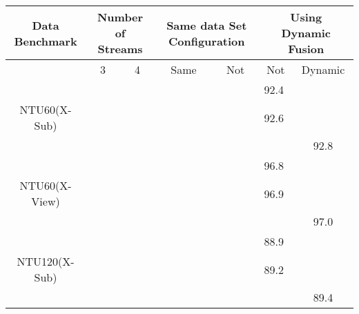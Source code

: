 \documentclass[letterpaper]{article} \usepackage[submission]{aaai23}  \usepackage{times}  \usepackage{helvet}  \usepackage{courier}  \usepackage[hyphens]{url}  \usepackage{graphicx} \urlstyle{rm} \def\UrlFont{\rm}  \usepackage{natbib}  \usepackage{caption} \frenchspacing  \setlength{\pdfpagewidth}{8.5in} \setlength{\pdfpageheight}{11in} \usepackage{algorithm}
\begin{document}
\begin{table*}[ht]
 \centering
\begin{tabular}{cccclll}
\hline\noalign{\smallskip}
Data Benchmark                                     & \multicolumn{2}{c}{Number of Streams}             &\multicolumn{2}{c}{Same data Set Configuration}  & \multicolumn{2}{c}{Using Dynamic Fusion}                \\ \hline
                                                   & 3                      & 4                      & Same                   & \multicolumn{1}{c}{Not} & \multicolumn{1}{c}{Not}   & \multicolumn{1}{c}{Dynamic} \\ \hline
\multicolumn{1}{c}{} & \multicolumn{1}{c}{} & \multicolumn{1}{c}{}  & \multicolumn{1}{c}{} & \multicolumn{1}{l}{}   & \multicolumn{1}{l}{92.4} & \multicolumn{1}{l}{}       \\ 
\multicolumn{1}{c}{{NTU60(X-Sub)}}                              & \multicolumn{1}{c}{} & \multicolumn{1}{c}{}  & \multicolumn{1}{c}{} & \multicolumn{1}{l}{}   & \multicolumn{1}{l}{92.6} & \multicolumn{1}{l}{}       \\ 
\multicolumn{1}{c}{}                              & \multicolumn{1}{l}{}  & \multicolumn{1}{c}{} & \multicolumn{1}{c}{}  & \multicolumn{1}{c}{}  & \multicolumn{1}{l}{}     & \multicolumn{1}{c}{92.8}   \\ \hline

\multicolumn{1}{c}{} & \multicolumn{1}{c}{} & \multicolumn{1}{c}{}  & \multicolumn{1}{c}{} & \multicolumn{1}{l}{}   & \multicolumn{1}{l}{96.8} & \multicolumn{1}{l}{}       \\ 
\multicolumn{1}{c}{{NTU60(X-View)}}                              & \multicolumn{1}{c}{} & \multicolumn{1}{c}{}  & \multicolumn{1}{c}{} & \multicolumn{1}{l}{}   & \multicolumn{1}{l}{96.9} & \multicolumn{1}{l}{}       \\ 
\multicolumn{1}{c}{}                              & \multicolumn{1}{l}{}  & \multicolumn{1}{c}{} & \multicolumn{1}{c}{}  & \multicolumn{1}{c}{}  & \multicolumn{1}{l}{}     & \multicolumn{1}{c}{97.0}   \\ \hline

\multicolumn{1}{c}{} & \multicolumn{1}{c}{} & \multicolumn{1}{c}{}  & \multicolumn{1}{c}{} & \multicolumn{1}{l}{}   & \multicolumn{1}{l}{88.9} & \multicolumn{1}{l}{}       \\ 
\multicolumn{1}{c}{{NTU120(X-Sub)}}                              & \multicolumn{1}{c}{} & \multicolumn{1}{c}{}  & \multicolumn{1}{c}{} & \multicolumn{1}{l}{}   & \multicolumn{1}{l}{89.2} & \multicolumn{1}{l}{}       \\ 
\multicolumn{1}{c}{}                              & \multicolumn{1}{l}{}  & \multicolumn{1}{c}{} & \multicolumn{1}{c}{}  & \multicolumn{1}{c}{}  & \multicolumn{1}{l}{}     & \multicolumn{1}{c}{89.4}   \\ \hline


\end{tabular}
\end{table*}
\end{document}
